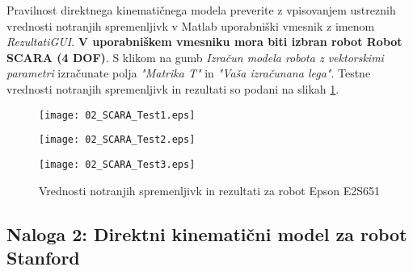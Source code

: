 \begin{mdframed}[backgroundcolor=green!20, shadow=false,roundcorner=12pt,topline
=false, rightline=false,bottomline=false,leftline=false]
Pravilnost direktnega kinematičnega modela preverite z vpisovanjem
ustreznih vrednosti notranjih spremenljivk v Matlab uporabniški
vmesnik z imenom \emph{RezultatiGUI}. \textbf{V uporabniškem
vmesniku mora biti izbran robot Robot SCARA (4 DOF)}. S klikom na
gumb \emph{Izračun modela robota z vektorskimi parametri} izračunate
polja \emph{"Matrika T"} in \emph{"Vaša izračunana lega"}. Testne
vrednosti notranjih spremenljivk in rezultati so podani na slikah
\ref{fRezultatiScara}.
\end{mdframed}


\begin{figure}[!h]
    \centering
    \texttt{[image: 02\_SCARA\_Test1.eps]}\vspace{0.1cm}\\%
\end{figure}

\begin{figure}[!h]
    \centering
    \texttt{[image: 02\_SCARA\_Test2.eps]}\vspace{0.1cm}\\%
\end{figure}

\begin{figure}[!h]
    \centering
    \texttt{[image: 02\_SCARA\_Test3.eps]}\\%
    \vspace{-0.3cm}
    \caption{Vrednosti notranjih spremenljivk in rezultati za robot Epson E2S651}
    \label{fRezultatiScara}
\end{figure}


\newpage


\subsection{Naloga 2: Direktni kinematični model za robot Stanford}\label{stanford}

